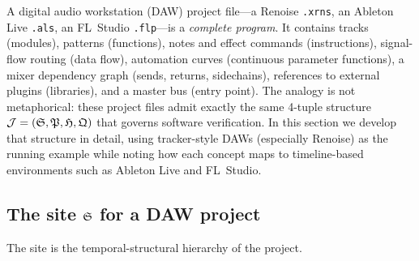 A digital audio workstation (DAW) project file---a Renoise
\texttt{.xrns}, an Ableton Live \texttt{.als}, an FL~Studio
\texttt{.flp}---is a \emph{complete program}.  It contains tracks
(modules), patterns (functions), notes and effect commands
(instructions), signal-flow routing (data flow), automation curves
(continuous parameter functions), a mixer dependency graph (sends,
returns, sidechains), references to external plugins (libraries),
and a master bus (entry point).  The analogy is not metaphorical:
these project files admit exactly the same 4-tuple structure
$\mathcal{J} = (\mathfrak{S}, \mathfrak{P}, \mathfrak{H}, \mathfrak{Q})$ that governs software
verification.  In this section we develop that structure in detail,
using tracker-style DAWs (especially Renoise) as the running
example while noting how each concept maps to timeline-based
environments such as Ableton Live and FL~Studio.

\subsection{The site \texorpdfstring{$\mathfrak{S}$}{S} for a DAW project}
\label{ssec:musical-site}

The site is the temporal-structural hierarchy of the project.

